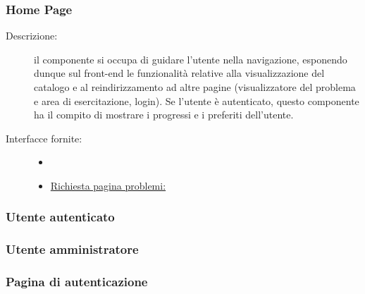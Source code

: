 \documentclass[11pt, a4paper]{article}
\theoremstyle{definition} %
\begin{document}
\subsubsection{Home Page}
\begin{description}
    \item[Descrizione:] il componente si occupa di guidare l'utente nella
    navigazione, esponendo dunque sul front-end le funzionalità relative
    alla visualizzazione del catalogo e al reindirizzamento ad altre pagine
    (visualizzatore del problema e area di esercitazione, login). Se l'utente
    è autenticato, questo componente ha il compito di mostrare i progressi e
    i preferiti dell'utente.
    \item[Interfacce fornite:]
    \begin{itemize}
        \item[]
        \item \underline{Richiesta pagina problemi:}
    \end{itemize}
\end{description}

\subsubsection{Utente autenticato}
\subsubsection{Utente amministratore}
\subsubsection{Pagina di autenticazione}
\end{document}
